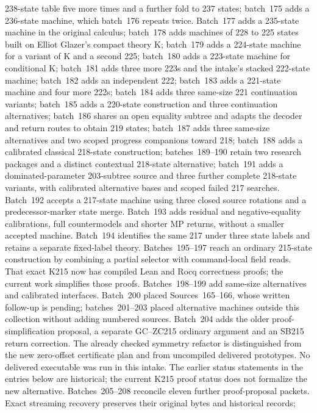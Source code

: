 \documentclass[11pt]{article}
\begin{document}
238-state table five more times and a further fold to 237 states; batch~175 adds a 236-state machine, which
batch~176 repeats twice. Batch~177 adds a 235-state machine in the original calculus;
batch~178 adds machines of 228 to 225 states built on Elliot Glazer's compact theory K;
batch~179 adds a 224-state machine for a variant of K and a second 225;
batch~180 adds a 223-state machine for conditional K; batch~181 adds three more
223s and the intake's stacked 222-state machine; batch~182 adds an independent 222;
batch~183 adds a 221-state machine and four more 222s; batch~184 adds three
same-size 221 continuation variants; batch~185 adds a 220-state construction and
three continuation alternatives; batch~186 shares an open equality subtree and
adapts the decoder and return routes to obtain 219 states; batch~187 adds three
same-size alternatives and two scoped progress companions toward 218; batch~188
adds a calibrated classical 218-state construction; batches~189--190 retain two
research packages and a distinct contextual 218-state alternative; batch~191 adds
a dominated-parameter 203-subtree source and three further complete 218-state
variants, with calibrated alternative bases and scoped failed 217 searches. Batch~192
accepts a 217-state machine using three closed source rotations and a
predecessor-marker state merge. Batch~193 adds residual and negative-equality
calibrations, full countermodels and shorter MP returns, without a smaller
accepted machine. Batch~194 identifies the same 217 under three state labels
and retains a separate fixed-label theory. Batches~195--197 reach an ordinary
215-state construction by combining a partial selector with command-local
field reads. That exact K215 now has compiled Lean and Rocq correctness
proofs; the current work simplifies those proofs. Batches~198--199 add
same-size alternatives and calibrated interfaces. Batch~200 placed
Sources~165--166, whose written follow-up is pending; batches~201--203 placed
alternative machines outside this collection without adding numbered sources.
Batch~204 adds the older proof-simplification proposal, a separate GC--ZC215
ordinary argument and an SB215 return correction. The already checked symmetry
refactor is distinguished from the new zero-offset certificate plan and from
uncompiled delivered prototypes. No delivered executable was run in this
intake. The earlier status statements in the entries below are historical;
the current K215 proof status does not formalize the new alternative.
Batches~205--208 reconcile eleven further proof-proposal packets. Exact
streaming recovery preserves their original bytes and historical records;
\end{document}
